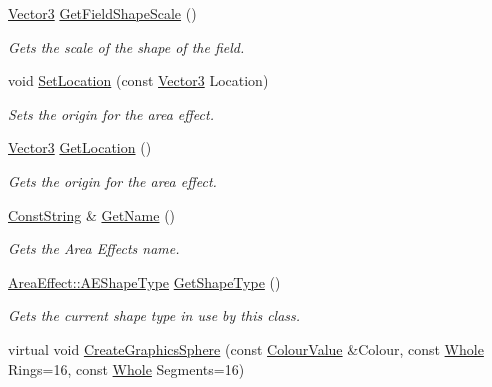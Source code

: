 \begin{DoxyCompactItemize}
\hyperlink{classphys_1_1Vector3}{Vector3} \hyperlink{classphys_1_1AreaEffect_a251d82e373c6ada5b80c023434e513f6}{GetFieldShapeScale} ()
\begin{DoxyCompactList}\small\item\em Gets the scale of the shape of the field. \item\end{DoxyCompactList}\item 
void \hyperlink{classphys_1_1AreaEffect_a9332d4f1c5d1eaa23c6db5e9b95d746e}{SetLocation} (const \hyperlink{classphys_1_1Vector3}{Vector3} Location)
\begin{DoxyCompactList}\small\item\em Sets the origin for the area effect. \item\end{DoxyCompactList}\item 
\hyperlink{classphys_1_1Vector3}{Vector3} \hyperlink{classphys_1_1AreaEffect_a76040dd90ff314ea6973dccf4e90ba37}{GetLocation} ()
\begin{DoxyCompactList}\small\item\em Gets the origin for the area effect. \item\end{DoxyCompactList}\item 
\hyperlink{namespacephys_a5ce5049f8b4bf88d6413c47b504ebb31}{ConstString} \& \hyperlink{classphys_1_1AreaEffect_a6395eeec0a3aec2385027cca35cf15cb}{GetName} ()
\begin{DoxyCompactList}\small\item\em Gets the Area Effects name. \item\end{DoxyCompactList}\item 
\hyperlink{classphys_1_1AreaEffect_a99b8746c43eac266d48ad613110dc6f9}{AreaEffect::AEShapeType} \hyperlink{classphys_1_1AreaEffect_a13b613426c282222fec2b93dbbd9e7a8}{GetShapeType} ()
\begin{DoxyCompactList}\small\item\em Gets the current shape type in use by this class. \item\end{DoxyCompactList}\item 
virtual void \hyperlink{classphys_1_1AreaEffect_a6d1e8ddcea39fa441f02010af1970a16}{CreateGraphicsSphere} (const \hyperlink{classphys_1_1ColourValue}{ColourValue} \&Colour, const \hyperlink{namespacephys_a460f6bc24c8dd347b05e0366ae34f34a}{Whole} Rings=16, const \hyperlink{namespacephys_a460f6bc24c8dd347b05e0366ae34f34a}{Whole} Segments=16)

\end{DoxyCompactItemize}
